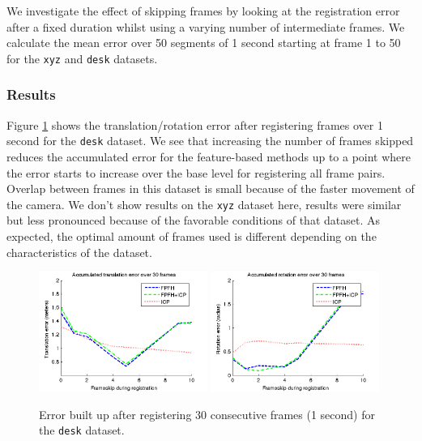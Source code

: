 \documentclass[a4paper]{article}
\begin{document}
We investigate the effect of skipping frames by looking at the registration error after a fixed duration whilst using a varying number of intermediate frames. We calculate the mean error over 50 segments of 1 second starting at frame 1 to 50 for the \texttt{xyz} and \texttt{desk} datasets.

\subsubsection{Results}

Figure \ref{fig:accumulated_error} shows the translation/rotation error after registering frames over 1 second for the \texttt{desk} dataset. We see that increasing the number of frames skipped reduces the accumulated error for the feature-based methods up to a point where the error starts to increase over the base level for registering all frame pairs. Overlap between frames in this dataset is small because of the faster movement of the camera.  We don't show results on the \texttt{xyz} dataset here, results were similar but less pronounced because of the favorable conditions of that dataset. As expected, the optimal amount of frames used is different depending on the characteristics of the dataset.

\begin{figure}[htbp]
    \centering
        \includegraphics[width=0.49\textwidth]{ims/deskAccumulatedtranslationerrorover30frames.png}
        \includegraphics[width=0.49\textwidth]{ims/deskAccumulatedrotationerrorover30frames.png}
    \caption{Error built up after registering 30 consecutive frames (1 second) for the \texttt{desk} dataset.}
    \label{fig:accumulated_error}
\end{figure}
\end{document}
